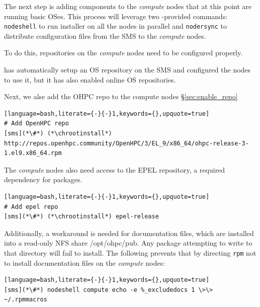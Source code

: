 
The next step is adding \OHPC{} components to the {\em compute} nodes that at this
point are running basic OSes.  This process will leverage two \Confluent{}-provided
commands: \texttt{nodeshell} to run \texttt{\pkgmgr{}} installer on all the
nodes in parallel  and \texttt{nodersync} to distribute configuration files from the
SMS to the {\em compute} nodes.

\noindent To do this, repositories on the {\em compute} nodes need to be configured
properly.

\Confluent{} has automatically setup an  OS repository on the SMS and configured the
nodes to use it, but it has  also enabled online OS repositories.


\noindent Next, we alse add the OHPC repo to the compute nodes \S\ref{sec:enable_repo}

\begin{lstlisting}[language=bash,literate={-}{-}1,keywords={},upquote=true]
# Add OpenHPC repo
[sms](*\#*) (*\chrootinstall*) http://repos.openhpc.community/OpenHPC/3/EL_9/x86_64/ohpc-release-3-1.el9.x86_64.rpm
\end{lstlisting}

The {\em compute} nodes also need access to the EPEL repository, a required
dependency for \OHPC{} packages.

\begin{lstlisting}[language=bash,literate={-}{-}1,keywords={},upquote=true]
# Add epel repo
[sms](*\#*) (*\chrootinstall*) epel-release

\end{lstlisting}


\noindent Additionally, a workaround is needed for \OHPC{} documentation files,
which are installed into a read-only NFS share /opt/ohpc/pub. Any package
attempting to write to that directory will fail to install. The following
prevents that by directing \texttt{rpm} not to install documentation files on
the {\em compute} nodes:

\begin{lstlisting}[language=bash,literate={-}{-}1,keywords={},upquote=true]
[sms](*\#*) nodeshell compute echo -e %_excludedocs 1 \>\> ~/.rpmmacros
\end{lstlisting}

